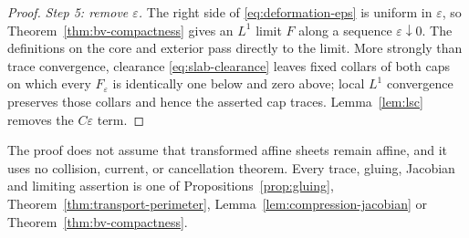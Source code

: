 \begin{proof}
\emph{Step 5: remove $\varepsilon$.}  The right side of
\eqref{eq:deformation-eps} is uniform in $\varepsilon$, so
Theorem~\ref{thm:bv-compactness} gives an $L^1$ limit $F$ along a sequence
$\varepsilon\downarrow0$.  The definitions on the core and exterior pass
directly to the limit.  More strongly than trace convergence, clearance
\eqref{eq:slab-clearance} leaves fixed collars of both caps on which every
$F_\varepsilon$ is identically one below and zero above; local $L^1$
convergence preserves those collars and hence the asserted cap traces.
Lemma~\ref{lem:lsc} removes the $C\varepsilon$ term.
\end{proof}

\begin{fnote}\label{fnote:deformation-honest}
The proof does not assume that transformed affine sheets remain affine, and it
uses no collision, current, or cancellation theorem.  Every trace, gluing,
Jacobian and limiting assertion is one of
Propositions~\ref{prop:gluing}, Theorem~\ref{thm:transport-perimeter},
Lemma~\ref{lem:compression-jacobian} or Theorem~\ref{thm:bv-compactness}.
\end{fnote}

